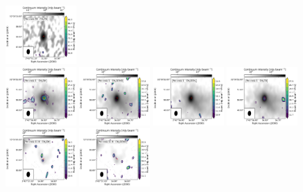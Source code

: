 \begin{figure}[htbp!]
  \includegraphics[width=0.24\textwidth]{./moment0/Set3_ID09_2_CH3CN_257527.pdf}
  \\
  \includegraphics[width=0.24\textwidth]{./moment0/Set3_ID06_CH3OH_243915.pdf}
  \includegraphics[width=0.24\textwidth]{./moment0/Set3_ID06_CH3OCHO_259342.pdf}
  \includegraphics[width=0.24\textwidth]{./moment0/Set3_ID06_CH3OCH3_259311.pdf}
  \includegraphics[width=0.24\textwidth]{./moment0/Set3_ID06_CH3CN_257527.pdf}
  \\
  \includegraphics[width=0.24\textwidth]{./moment0/Set3_ID07_2_CH3OH_243915.pdf}
  \includegraphics[width=0.24\textwidth]{./moment0/Set3_ID07_2_CH3OCHO_259342.pdf}

\end{figure}
